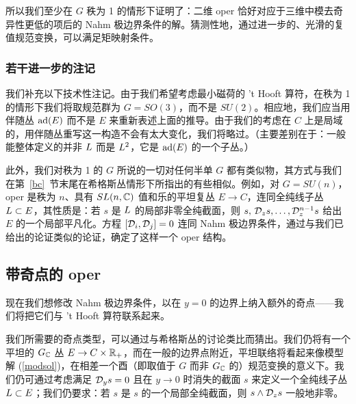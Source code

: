 所以我们至少在 $G$ 秩为 1 的情形下证明了：二维 oper 恰好对应于三维中模去奇异性更低的项后的 Nahm 极边界条件的解。猜测性地，通过进一步的、光滑的复值规范变换，可以满足矩映射条件。

\subsubsection{若干进一步的注记}\label{somefurth}
我们补充以下技术性注记。由于我们希望考虑最小磁荷的 't Hooft 算符，在秩为 1 的情形下我们将取规范群为 $G=SO(3)$，而不是 $SU(2)$。相应地，我们应当用伴随丛 ${\mathrm{ad}}(E)$ 而不是 $E$ 来重新表述上面的推导。由于我们的考虑在 $C$ 上是局域的，用伴随丛重写这一构造不会有太大变化，我们将略过。（主要差别在于：一般能整体定义的并非 ${ L}$ 而是 ${ L}^2$，它是 ${\mathrm{ad}}(E)$ 的一个子丛。）

此外，我们对秩为 1 的 $G$ 所说的一切对任何半单 $G$ 都有类似物，其方式与我们在第~\ref{bc}~节末尾在希格斯丛情形下所指出的有些相似。例如，对 $G=SU(n)$，oper 是秩为 $n$、具有 $SL(n,{\mathbb C})$ 值和乐的平坦复丛 $E\to C$，连同全纯线子丛 ${ L}\subset E$，其性质是：若 $s$ 是 ${ L}$ 的局部非零全纯截面，则 $s,\,{\mathcal D}_z s,\dots,{\mathcal D}_z^{n-1}s$ 给出 $E$ 的一个局部平凡化。方程 $[{\mathcal D}_i,{\mathcal D}_j]=0$ 连同 Nahm 极边界条件，通过与我们已给出的论证类似的论证，确定了这样一个 oper 结构。

\subsection{带奇点的 oper}\label{opsing}

现在我们想修改 Nahm 极边界条件，以在 $y=0$ 的边界上纳入额外的奇点——我们将把它们与 't Hooft 算符联系起来。

我们所需要的奇点类型，可以通过与希格斯丛的讨论类比而猜出。我们仍将有一个平坦的 $G_{\mathbb C}$ 丛 $E\to C\times {\mathbb R}_+$，而在一般的边界点附近，平坦联络将看起来像模型解 (\ref{modsol})，在相差一个酉（即取值于 $G$ 而非 $G_{\mathbb C}$ 的）规范变换的意义下。我们仍可通过考虑满足 ${\mathcal D}_ys=0$ 且在 $y\to 0$ 时消失的截面 $s$ 来定义一个全纯线子丛 ${ L}\subset E$；我们仍要求：若 $s$ 是 $s$ 的一个局部全纯截面，则 $s\wedge {\mathcal D}_z s$ 一般地非零。

